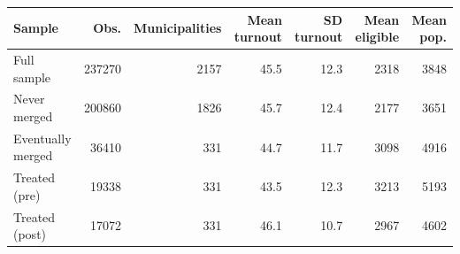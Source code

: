 
\begin{tabular}{lrrrrrr}
\toprule
Sample & Obs. & Municipalities & Mean turnout & SD turnout & Mean eligible & Mean pop.\\
\midrule
Full sample & 237270 & 2157 & 45.5 & 12.3 & 2318 & 3848\\
Never merged & 200860 & 1826 & 45.7 & 12.4 & 2177 & 3651\\
Eventually merged & 36410 & 331 & 44.7 & 11.7 & 3098 & 4916\\
Treated (pre) & 19338 & 331 & 43.5 & 12.3 & 3213 & 5193\\
Treated (post) & 17072 & 331 & 46.1 & 10.7 & 2967 & 4602\\
\bottomrule
\end{tabular}

